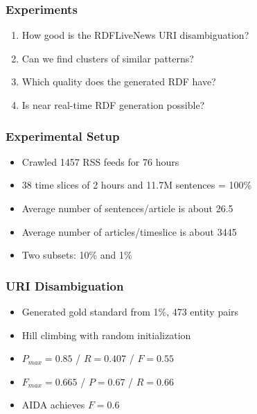 \documentclass{beamer}
\begin{document}

\begin{frame}
    \frametitle{Experiments}
    \begin{enumerate}
        \item How good is the RDFLiveNews URI disambiguation? 
        \item Can we find clusters of similar patterns? 
        \item Which quality does the generated RDF have? 
        \item Is near real-time RDF generation possible? 
    \end{enumerate}
\end{frame}


\begin{frame}
    \frametitle{Experimental Setup}
    \begin{itemize}
        \item Crawled 1457 RSS feeds for 76 hours 
        \item 38 time slices of 2 hours and 11.7M sentences = 100\% 
        \item Average number of sentences/article is about 26.5 
        \item Average number of articles/timeslice is about 3445 
        \item Two subsets: 10\% and 1\% 
    \end{itemize}
\end{frame}


\begin{frame}
    \frametitle{URI Disambiguation}
    \begin{itemize}
        \item Generated gold standard from 1\%, 473 entity pairs
        \item Hill climbing with random initialization
        \item $P_{max} = 0.85$ / $R = 0.407$ / $F = 0.55$
        \item $F_{max} = 0.665$ / $P = 0.67$ / $R = 0.66$
        \item AIDA achieves $F = 0.6$%
    \end{itemize}
\end{frame}
\end{document}
